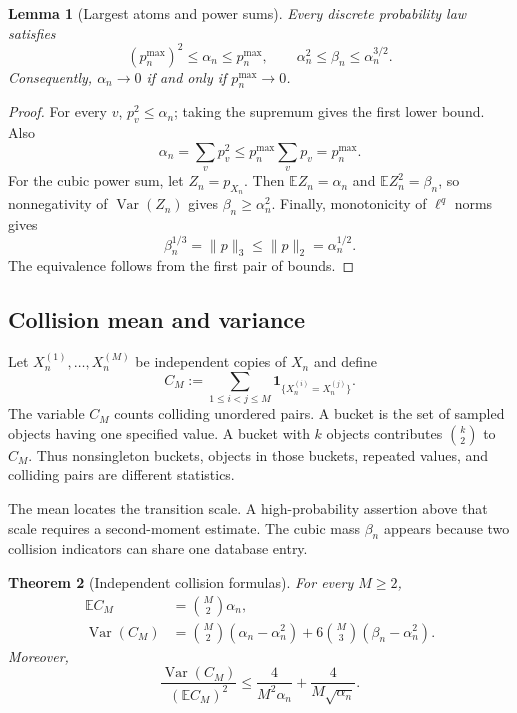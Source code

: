 \documentclass[9pt,twoside]{pnas-new}
\newtheorem{theorem}{Theorem}
\newtheorem{lemma}[theorem]{Lemma}
\theoremstyle{definition}
\theoremstyle{remark}
\begin{document}
\begin{lemma}[Largest atoms and power sums]
\label{lem:si-power-bounds}
Every discrete probability law satisfies
\begin{equation}
(p_n^{\max})^2\le\alpha_n\le p_n^{\max},
\qquad
\alpha_n^2\le\beta_n\le\alpha_n^{3/2}.
\label{eq:si-power-bounds}
\end{equation}
Consequently, $\alpha_n\to0$ if and only if $p_n^{\max}\to0$.
\end{lemma}

\begin{proof}
For every $v$, $p_v^2\le\alpha_n$; taking the supremum gives the first lower bound. Also
\[
\alpha_n=\sum_v p_v^2
\le p_n^{\max}\sum_vp_v=p_n^{\max}.
\]
For the cubic power sum, let $Z_n=p_{X_n}$. Then
$\mathbb E Z_n=\alpha_n$ and $\mathbb E Z_n^2=\beta_n$, so nonnegativity of $\operatorname{Var}(Z_n)$ gives $\beta_n\ge\alpha_n^2$. Finally, monotonicity of $\ell^q$ norms gives
\[
\beta_n^{1/3}=\|p\|_3\le\|p\|_2=\alpha_n^{1/2}.
\]
The equivalence follows from the first pair of bounds.
\end{proof}

\subsection{Collision mean and variance}
Let $X_n^{(1)},\ldots,X_n^{(M)}$ be independent copies of $X_n$ and define
\begin{equation}
C_M:=\sum_{1\le i<j\le M}
\mathbf 1_{\{X_n^{(i)}=X_n^{(j)}\}}.
\label{eq:si-collision-count}
\end{equation}
The variable $C_M$ counts colliding unordered pairs. A bucket is the set of sampled objects having one specified value. A bucket with $k$ objects contributes $\binom k2$ to $C_M$. Thus nonsingleton buckets, objects in those buckets, repeated values, and colliding pairs are different statistics.

The mean locates the transition scale. A high-probability assertion above that scale requires a second-moment estimate. The cubic mass $\beta_n$ appears because two collision indicators can share one database entry.

\begin{theorem}[Independent collision formulas]
\label{thm:si-collision-calculus}
For every $M\ge2$,
\begin{align}
\mathbb E C_M
&=\binom M2\alpha_n,
\label{eq:si-collision-mean}\\
\operatorname{Var}(C_M)
&=\binom M2(\alpha_n-\alpha_n^2)
+6\binom M3(\beta_n-\alpha_n^2).
\label{eq:si-collision-variance}
\end{align}
Moreover,
\begin{equation}
\frac{\operatorname{Var}(C_M)}
     {(\mathbb E C_M)^2}
\le
\frac{4}{M^2\alpha_n}
+\frac{4}{M\sqrt{\alpha_n}}.
\label{eq:si-relative-variance}
\end{equation}
\end{theorem}
\end{document}
